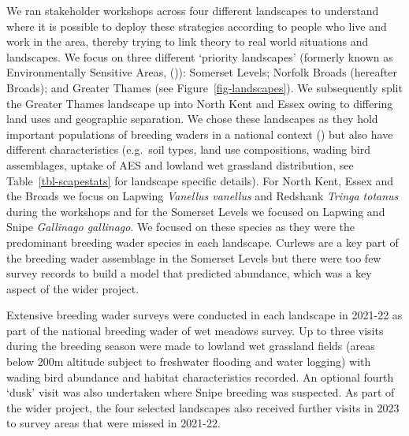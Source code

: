 \documentclass[
  12pt,
  letterpaper,
  DIV=11,
  numbers=noendperiod]{scrartcl}
\begin{document}
We ran stakeholder workshops across four different landscapes to
understand where it is possible to deploy these strategies according to
people who live and work in the area, thereby trying to link theory to
real world situations and landscapes. We focus on three different
`priority landscapes' (formerly known as Environmentally Sensitive
Areas, ()): Somerset
Levels; Norfolk Broads (hereafter Broads); and Greater Thames (see
Figure~\ref{fig-landscapes}). We subsequently split the Greater Thames
landscape up into North Kent and Essex owing to differing land uses and
geographic separation. We chose these landscapes as they hold important
populations of breeding waders in a national context
() but also have different
characteristics (e.g.~soil types, land use compositions, wading bird
assemblages, uptake of AES and lowland wet grassland distribution, see
Table~\ref{tbl-scapestats} for landscape specific details). For North
Kent, Essex and the Broads we focus on Lapwing \emph{Vanellus vanellus}
and Redshank \emph{Tringa totanus} during the workshops and for the
Somerset Levels we focused on Lapwing and Snipe \emph{Gallinago
gallinago}. We focused on these species as they were the predominant
breeding wader species in each landscape. Curlews are a key part of the
breeding wader assemblage in the Somerset Levels but there were too few
survey records to build a model that predicted abundance, which was a
key aspect of the wider project.

Extensive breeding wader surveys were conducted in each landscape in
2021-22 as part of the national breeding wader of wet meadows survey. Up
to three visits during the breeding season were made to lowland wet
grassland fields (areas below 200m altitude subject to freshwater
flooding and water logging) with wading bird abundance and habitat
characteristics recorded. An optional fourth `dusk' visit was also
undertaken where Snipe breeding was suspected. As part of the wider
project, the four selected landscapes also received further visits in
2023 to survey areas that were missed in 2021-22.
\end{document}
